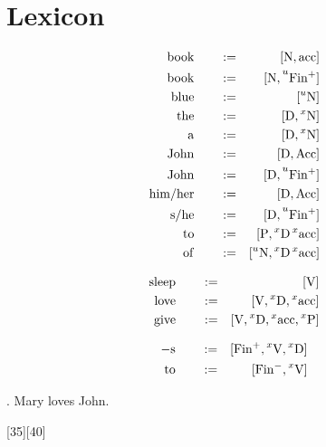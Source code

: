 \documentclass{article}
\begin{document}
\section{Lexicon}

\begin{glexicon}[nominal]
\begin{align}
\syndef{book}{[N,acc]}\\
\syndef{book}{[N,\un{Fin^+}]}\\
\syndef{blue}{[\un{N}]}\\
\syndef{the}{[D,\ux{N}]}\\
\syndef{a}{[D,\ux{N}]}\\
\syndef{John}{[D,Acc]}\\
\syndef{John}{[D,\un{Fin^+}]}\\
\syndef{him/her}{[D,Acc]}\\
\syndef{s/he}{[D,\un{Fin^+}]}\\
\syndef{to}{[P,\ux{D}\ux{acc}]}\\
\syndef{of}{[\un{N},\ux{D}\ux{acc}]}
\end{align}
\end{glexicon}


\begin{glexicon}[verbal]
\begin{align}
\syndef{sleep}{[V]}\\
\syndef{love}{[V,\ux{D},\ux{acc}]}\\
\syndef{give}{[V,\ux{D},\ux{acc},\ux{P}]}
\end{align}
\end{glexicon}

\begin{glexicon}[functional]
\begin{align}
				\syndef{-s}{[Fin^+,\ux{V},\ux{D}]}\\
	      \syndef{to}{[Fin^-,\ux{V}]}\\
\end{align}
\end{glexicon}


\ex. Mary loves John.

[35][40]
\end{document}
